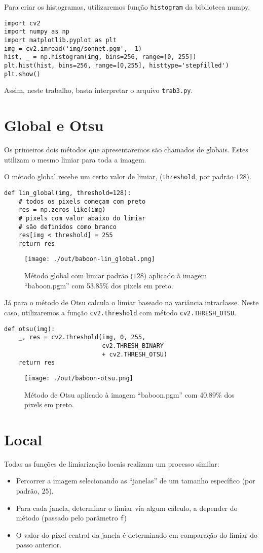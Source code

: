 \documentclass[twocolumn, 10pt]{article}
\begin{document}
Para criar os histogramas, utilizaremos função \texttt{histogram} da biblioteca numpy.
\begin{verbatim}
import cv2
import numpy as np
import matplotlib.pyplot as plt
img = cv2.imread('img/sonnet.pgm', -1)
hist, _ = np.histogram(img, bins=256, range=[0, 255])
plt.hist(hist, bins=256, range=[0,255], histtype='stepfilled')
plt.show()
\end{verbatim}

Assim, neste trabalho, basta interpretar o arquivo \texttt{trab3.py}.
\section*{Global e Otsu}
\label{sec:orga849713}
Os primeiros dois métodos que apresentaremos são chamados de globais.
Estes utilizam o mesmo limiar para toda a imagem.

O método global recebe um certo valor de limiar, (\texttt{threshold}, por padrão \(128\)).
\begin{verbatim}
def lin_global(img, threshold=128):
    # todos os pixels começam com preto
    res = np.zeros_like(img)
    # pixels com valor abaixo do limiar
    # são definidos como branco
    res[img < threshold] = 255
    return res
\end{verbatim}
\begin{figure}[htbp]
\centering
\texttt{[image: ./out/baboon-lin\_global.png]}
\caption{Método global com limiar padrão (\(128\)) aplicado à imagem ``baboon.pgm'' com 53.85\% dos pixels em preto.}
\end{figure}

Já para o método de Otsu calcula o limiar baseado na variância intraclasse. Neste caso, utilizaremos a função \texttt{cv2.threshold} com método \texttt{cv2.THRESH\_OTSU}.
\begin{verbatim}
def otsu(img):
    _, res = cv2.threshold(img, 0, 255,
                           cv2.THRESH_BINARY
                           + cv2.THRESH_OTSU)
    return res
\end{verbatim}
\begin{figure}[htbp]
\centering
\texttt{[image: ./out/baboon-otsu.png]}
\caption{Método de Otsu aplicado à imagem ``baboon.pgm'' com 40.89\% dos pixels em preto.}
\end{figure}

\section*{Local}
\label{sec:org1f489e9}
Todas as funções de limiarização locais realizam um processo similar:
\begin{itemize}
\item Percorrer a imagem selecionando as ``janelas'' de um tamanho específico (por padrão, \(25\)).
\item Para cada janela, determinar o limiar via algum cálculo, a depender do método (passado pelo parâmetro \texttt{f})
\item O valor do pixel central da janela é determinado em comparação do limiar do passo anterior.
\end{itemize}
\end{document}
